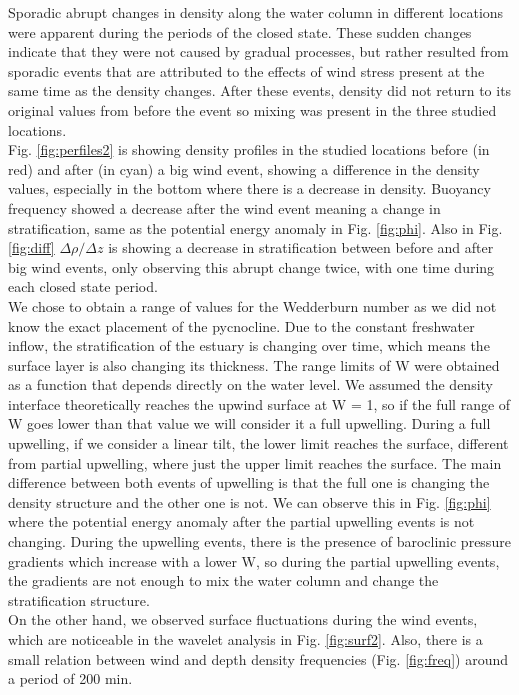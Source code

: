 \documentclass[tesis.tex]{subfiles}
\begin{document}
Sporadic abrupt changes in density along the water column in different locations were apparent during the periods of the closed state. These sudden changes indicate that they were not caused by gradual processes, but rather resulted from sporadic events that are attributed to the effects of wind stress present at the same time as the density changes. After these events, density did not return to its original values from before the event so mixing was present in the three studied locations.\\

Fig. \ref{fig:perfiles2} is showing density profiles in the studied locations before (in red) and after (in cyan) a big wind event, showing a difference in the density values, especially in the bottom where there is a decrease in density. Buoyancy frequency showed a decrease after the wind event meaning a change in stratification, same as the potential energy anomaly in Fig. \ref{fig:phi}. Also in Fig. \ref{fig:diff} $\Delta \rho/\Delta z$ is showing a decrease in stratification between before and after big wind events, only observing this abrupt change twice, with one time during each closed state period.\\

We chose to obtain a range of values for the Wedderburn number as we did not know the exact placement of the pycnocline. Due to the constant freshwater inflow, the stratification of the estuary is changing over time, which means the surface layer is also changing its thickness. The range limits of W were obtained as a function that depends directly on the water level. We assumed the density interface theoretically reaches the upwind surface at W = 1, so if the full range of W goes lower than that value we will consider it a full upwelling. During a full upwelling, if we consider a linear tilt, the lower limit reaches the surface, different from partial upwelling, where just the upper limit reaches the surface. The main difference between both events of upwelling is that the full one is changing the density structure and the other one is not. We can observe this in Fig. \ref{fig:phi} where the potential energy anomaly after the partial upwelling events is not changing. During the upwelling events, there is the presence of baroclinic pressure gradients which increase with a lower W, so during the partial upwelling events, the gradients are not enough to mix the water column and change the stratification structure.\\

On the other hand, we observed surface fluctuations during the wind events, which are noticeable in the wavelet analysis in Fig. \ref{fig:surf2}. Also, there is a small relation between wind and depth density frequencies (Fig. \ref{fig:freq}) around a period of 200 min.\\
\end{document}
